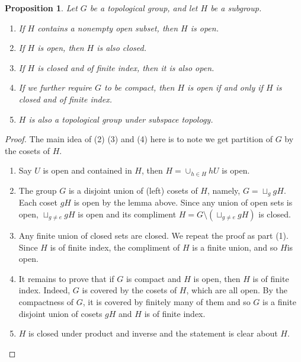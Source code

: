 \documentclass[12pt]{report}
\newtheorem{proposition}[theorem]{Proposition}
{\theoremstyle{remark}\newtheorem*{remark}{Remark}}
\theoremstyle{definition}
\begin{document}
\begin{proposition}\label{11.26.4}
	Let $G$ be a topological group, and let $H$ be a subgroup.
	\begin{enumerate}
		\item If $H$ contains a nonempty open subset, then $H$ is open.
		\item If $H$ is open, then $H$ is also closed.
		\item If $H$ is closed and of finite index, then it is also open.
		\item If we further require $G$ to be compact, then $H$ is open if and only if $H$ is closed and of finite index.
		\item $H$ is also a topological group under subspace topology.
	\end{enumerate}
\end{proposition}
\begin{proof}
	The main idea of (2) (3) and (4) here is to note we get partition of $G$ by the cosets of $H$.
	\begin{enumerate}
		\item Say $U$ is open and contained in $H$, then $H=\cup_{h\in H} hU$ is open.
		\item The group $G$ is a disjoint union of (left) cosets of $H$, namely, $G=\sqcup_{g} gH$. Each coset $gH$ is open by the lemma above. Since any union of open sets is open, $\sqcup_{g\not= e}gH$ is open and its compliment $H=G\setminus (\sqcup_{g\not= e}gH)$ is closed.
		\item Any finite union of closed sets are closed. We repeat the proof as part (1). Since $H$ is of finite index, the compliment of $H$ is a finite union, and so $H$is  open.
		\item It remains to prove that if $G$ is compact and $H$ is open, then $H$ is of finite index. Indeed, $G$ is covered by the cosets of $H$, which are all open. By the compactness of $G$, it is covered by finitely many of them and so $G$ is a finite disjoint union of cosets $gH$ and $H$ is of finite index.
		\item $H$ is closed under product and inverse and the statement is clear about $H$.
	\end{enumerate}
\end{proof}
\end{document}
